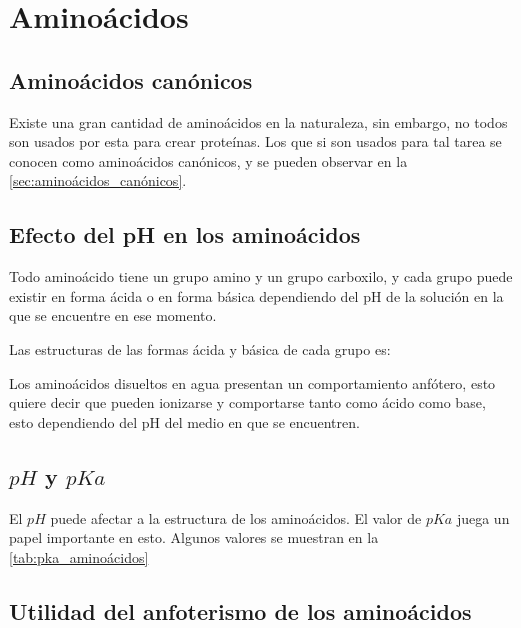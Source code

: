 \section{Aminoácidos}

\subsection{Aminoácidos canónicos}

Existe una gran cantidad de aminoácidos en la naturaleza, sin embargo, no todos son usados por esta para crear proteínas. Los que si son usados para tal tarea se conocen como aminoácidos canónicos, y se pueden observar en la \autoref{sec:aminoácidos_canónicos}.

\subsection{Efecto del pH en los aminoácidos}

Todo aminoácido tiene un grupo amino y un grupo carboxilo, y cada grupo puede existir en forma ácida o en forma básica dependiendo del pH de la solución en la que se encuentre en ese momento.

Las estructuras de las formas ácida y básica de cada grupo es:

    


Los aminoácidos disueltos en agua presentan un comportamiento anfótero, esto quiere decir que pueden ionizarse y comportarse tanto como ácido como base, esto dependiendo del pH del medio en que se encuentren.

\subsection{$pH$ y $pKa$}

El $pH$ puede afectar a la estructura de los aminoácidos. El valor de $pKa$ juega un papel importante en esto. Algunos valores se muestran en la \autoref{tab:pka_aminoácidos}

    

\subsection{Utilidad del anfoterismo de los aminoácidos}

